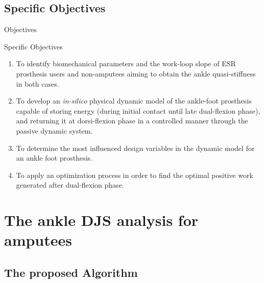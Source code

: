 \documentclass[10pt]{beamer}
\begin{document}
\subsection{Specific Objectives}
\begin{frame}{Objectives}

\begin{exampleblock}{Specific Objectives}

\begin{enumerate}

\item To identify biomechanical parameters and the work-loop slope of ESR prosthesis users and non-amputees aiming to obtain the ankle quasi-stiffness in both cases.

\item To develop an \textit{in-silico} physical dynamic model of the ankle-foot prosthesis capable of storing energy (during initial contact until late dual-flexion phase), and returning it at dorsi-flexion phase in a controlled manner through the passive dynamic system.

\item To determine the most influenced design variables in the dynamic model for an ankle foot prosthesis.

\item To apply an optimization process in order to find the optimal positive work generated after dual-flexion phase. 

\end{enumerate}
\end{exampleblock}
\end{frame}

\section{The ankle DJS analysis for amputees}

\subsection{The proposed Algorithm}
\end{document}

